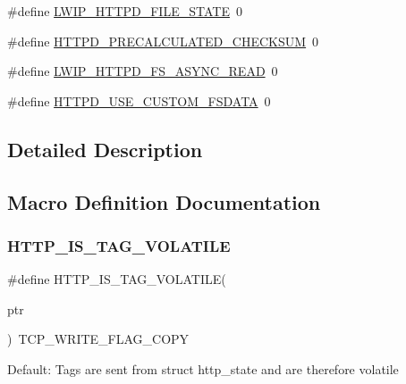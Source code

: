\begin{DoxyCompactItemize}
\#define \hyperlink{group__httpd__opts_gaedd0fa3d356170d8ca3557acb410fd7c}{L\+W\+I\+P\+\_\+\+H\+T\+T\+P\+D\+\_\+\+F\+I\+L\+E\+\_\+\+S\+T\+A\+TE}~0
\item 
\#define \hyperlink{group__httpd__opts_ga6e5de8515c89af12277e4cb011165103}{H\+T\+T\+P\+D\+\_\+\+P\+R\+E\+C\+A\+L\+C\+U\+L\+A\+T\+E\+D\+\_\+\+C\+H\+E\+C\+K\+S\+UM}~0
\item 
\#define \hyperlink{group__httpd__opts_ga51cb673cb5cc362acc409f23c1e0a331}{L\+W\+I\+P\+\_\+\+H\+T\+T\+P\+D\+\_\+\+F\+S\+\_\+\+A\+S\+Y\+N\+C\+\_\+\+R\+E\+AD}~0
\item 
\#define \hyperlink{group__httpd__opts_gafd16fcfb798be426cc87611772ba437c}{H\+T\+T\+P\+D\+\_\+\+U\+S\+E\+\_\+\+C\+U\+S\+T\+O\+M\+\_\+\+F\+S\+D\+A\+TA}~0
\end{DoxyCompactItemize}


\subsection{Detailed Description}


\subsection{Macro Definition Documentation}
\mbox{\label{group__httpd__opts_ga662e88120b507426374dd8ebbd54a048}} 
\subsubsection{\texorpdfstring{H\+T\+T\+P\+\_\+\+I\+S\+\_\+\+T\+A\+G\+\_\+\+V\+O\+L\+A\+T\+I\+LE}{HTTP\_IS\_TAG\_VOLATILE}\hspace{0.1cm}{\footnotesize\ttfamily [1/2]}}
{\footnotesize\ttfamily \#define H\+T\+T\+P\+\_\+\+I\+S\+\_\+\+T\+A\+G\+\_\+\+V\+O\+L\+A\+T\+I\+LE(\begin{DoxyParamCaption}\item[{}]{ptr }\end{DoxyParamCaption})~T\+C\+P\+\_\+\+W\+R\+I\+T\+E\+\_\+\+F\+L\+A\+G\+\_\+\+C\+O\+PY}

Default\+: Tags are sent from struct http\+\_\+state and are therefore volatile \mbox{\label{group__httpd__opts_ga662e88120b507426374dd8ebbd54a048}} 
